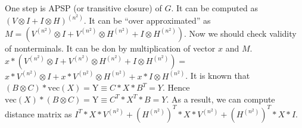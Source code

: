 \documentclass[12pt]{article}  %
\theoremstyle{definition}
\theoremstyle{remark}
\begin{document}

One step is APSP (or transitive closure) of $G$.
It can be computed as $(V \otimes I + I \otimes H)^{(n^2)}$.
It can be ``over approximated'' as $M=(V^{(n^2)} \otimes I + V^{(n^2)} \otimes H^{(n^2)} + I \otimes H^{(n^2)})$.
Now we should check validity of nonterminals.
It can be don by multiplication of vector $x$ and $M$.
$x*(V^{(n^2)} \otimes I + V^{(n^2)} \otimes H^{(n^2)} + I \otimes H^{(n^2)}) = $
$x*V^{(n^2)} \otimes I + x*V^{(n^2)} \otimes H^{(n^2)} + x * I \otimes H^{(n^2)} $.
It is known that $(B \otimes C)*\text{vec}(X) = \text{Y} \equiv C*X*B^T = Y$.
Hence $\text{vec}(X) * (B \otimes C) = \text{Y} \equiv C^T*X^T*B = Y$.
As a result, we can compute distance matrix as $I^T * X * V^{(n^2)} + (H^{(n^2)})^T * X * V^{(n^2)} + (H^{(n^2)})^T * X * I $.
\end{document}
